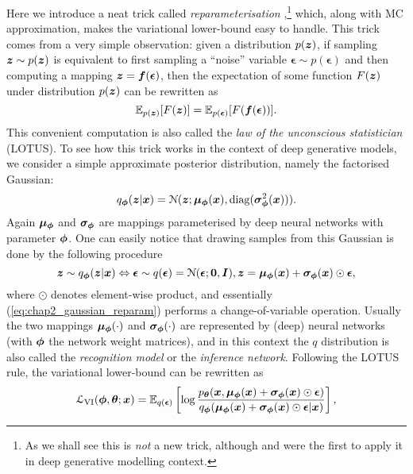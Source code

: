 Here we introduce a neat trick called \emph{reparameterisation} \citep{kingma:vae2014, rezende:vae2014},\footnote{As we shall see this is \emph{not} a new trick, although \cite{kingma:vae2014} and \cite{rezende:vae2014} were the first to apply it in deep generative modelling context.} which, along with MC approximation, makes the variational lower-bound easy to handle. This trick comes from a very simple observation: given a distribution $p(\bm{z})$, if sampling $\bm{z} \sim p(\bm{z})$ is equivalent to first sampling a ``noise'' variable $\bm{\epsilon} \sim p(\bm{\epsilon})$ and then computing a mapping $\bm{z} = \bm{f}(\bm{\epsilon})$, then the expectation of some function $F(\bm{z})$ under distribution $p(\bm{z})$ can be rewritten as
$$ \mathbb{E}_{p(\bm{z})} [ F(\bm{z}) ] = \mathbb{E}_{p(\bm{\epsilon})} [ F(\bm{f}(\bm{\epsilon})) ]. $$
%
This convenient computation is also called the \emph{law of the unconscious statistician} (LOTUS). To see how this trick works in the context of deep generative models, we consider a simple approximate posterior distribution, namely the factorised Gaussian:
\begin{equation*}
q_{\bm{\phi}}(\bm{z} | \bm{x}) = \mathcal{N}(\bm{z}; \bm{\mu}_{\bm{\phi}}(\bm{x}), \text{diag}(\bm{\sigma}^2_{\bm{\phi}}(\bm{x}) ) ).
\end{equation*}
Again $\bm{\mu}_{\bm{\phi}}$ and $\bm{\sigma}_{\bm{\phi}}$ are mappings parameterised by deep neural networks with parameter $\bm{\phi}$. One can easily notice that drawing samples from this Gaussian is done by the following procedure
\begin{equation}
\bm{z} \sim q_{\bm{\phi}}(\bm{z}|\bm{x}) \Leftrightarrow \bm{\epsilon} \sim q(\bm{\epsilon}) = \mathcal{N}(\bm{\epsilon}; \bm{0}, \bm{I}), \bm{z} = \bm{\mu}_{\bm{\phi}}(\bm{x}) + \bm{\sigma}_{\bm{\phi}}(\bm{x}) \odot \bm{\epsilon},
\label{eq:chap2_gaussian_reparam}
\end{equation}
where $\odot$ denotes element-wise product, and essentially (\ref{eq:chap2_gaussian_reparam}) performs a change-of-variable operation. Usually the two mappings $\bm{\mu}_{\bm{\phi}}(\cdot)$ and $\bm{\sigma}_{\bm{\phi}}(\cdot)$ are represented by (deep) neural networks (with $\bm{\phi}$ the network weight matrices), and in this context the $q$ distribution is also called the \emph{recognition model} or the \emph{inference network}. Following the LOTUS rule, the variational lower-bound can be rewritten as
\begin{equation}
\mathcal{L}_{\text{VI}}(\bm{\phi}, \bm{\theta}; \bm{x}) = \mathbb{E}_{q(\bm{\epsilon})} \left[ \log \frac{p_{\bm{\theta}}(\bm{x}, \bm{\mu}_{\bm{\phi}}(\bm{x}) + \bm{\sigma}_{\bm{\phi}}(\bm{x}) \odot \bm{\epsilon})}{q_{\bm{\phi}}(\bm{\mu}_{\bm{\phi}}(\bm{x}) + \bm{\sigma}_{\bm{\phi}}(\bm{x}) \odot \bm{\epsilon}  |\bm{x})} \right],
\end{equation}
